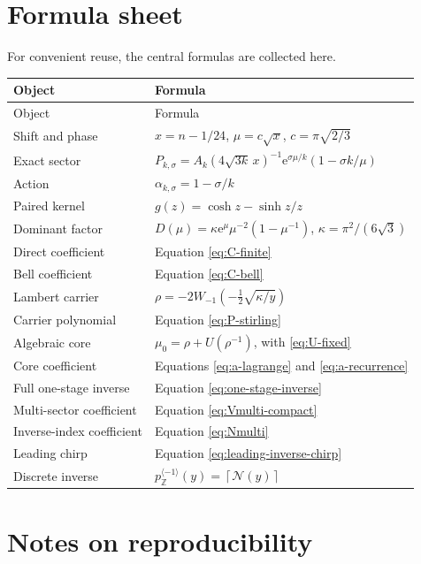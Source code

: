 \documentclass[11pt,a4paper]{article}
\numberwithin{equation}{section}
\theoremstyle{definition}
\theoremstyle{remark}
\newcommand{\e}{\mathrm e}
\newcommand{\Z}{\mathbb Z}
\newcommand{\Ncal}{\mathcal N}
\newcommand{\ceil}[1]{\left\lceil#1\right\rceil}
\begin{document}
\section{Formula sheet}

For convenient reuse, the central formulas are collected here.

\begin{longtable}{p{}p{}}
\toprule
Object & Formula\\
\midrule
\endfirsthead
\toprule
Object & Formula\\
\midrule
\endhead
Shift and phase & $x=n-1/24$, $\mu=c\sqrt x$, $c=\pi\sqrt{2/3}$\\[1mm]
Exact sector & $P_{k,\sigma}=A_k(4\sqrt{3k}\,x)^{-1}
\e^{\sigma\mu/k}(1-\sigma k/\mu)$\\[1mm]
Action & $\alpha_{k,\sigma}=1-\sigma/k$\\[1mm]
Paired kernel & $g(z)=\cosh z-\sinh z/z$\\[1mm]
Dominant factor & $D(\mu)=\kappa\e^\mu\mu^{-2}(1-\mu^{-1})$,
$\kappa=\pi^2/(6\sqrt3)$\\[1mm]
Direct coefficient & Equation \eqref{eq:C-finite}\\[1mm]
Bell coefficient & Equation \eqref{eq:C-bell}\\[1mm]
Lambert carrier & $\rho=-2W_{-1}(-\frac12\sqrt{\kappa/y})$\\[1mm]
Carrier polynomial & Equation \eqref{eq:P-stirling}\\[1mm]
Algebraic core & $\mu_0=\rho+U(\rho^{-1})$, with \eqref{eq:U-fixed}\\[1mm]
Core coefficient & Equations \eqref{eq:a-lagrange} and \eqref{eq:a-recurrence}\\[1mm]
Full one-stage inverse & Equation \eqref{eq:one-stage-inverse}\\[1mm]
Multi-sector coefficient & Equation \eqref{eq:Vmulti-compact}\\[1mm]
Inverse-index coefficient & Equation \eqref{eq:Nmulti}\\[1mm]
Leading chirp & Equation \eqref{eq:leading-inverse-chirp}\\[1mm]
Discrete inverse & $p_{\Z}^{\langle-1\rangle}(y)=\ceil{\Ncal(y)}$\\
\bottomrule
\end{longtable}

\section{Notes on reproducibility}
\end{document}
